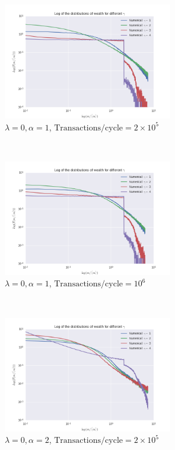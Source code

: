 \documentclass[a4paper, 10pt]{article}
\begin{document}
\begin{figure}[!hb] %
    \begin{subfigure}[H!]{0.5\textwidth}
        \centering
        \includegraphics[height=2.0in]{logDistGammasA1.png} %
        \caption{$\lambda=0, \alpha=1$, $\mathrm{Transactions/cycle}=2\times 10^5$}
    \end{subfigure}%
    ~ 
    \begin{subfigure}[H!]{0.5\textwidth}
        \centering
        \includegraphics[height=2.0in]{logDistGammasA1_v2.png}
        \caption{$\lambda=0, \alpha=1$, $\mathrm{Transactions/cycle}= 10^6$}
    \end{subfigure}
     ~
    \begin{subfigure}[H!]{0.5\textwidth}
        \centering
        \includegraphics[height=2.0in]{logDistGammasA2.png}
        \caption{$\lambda=0, \alpha=2$, $\mathrm{Transactions/cycle}=2\times 10^5$}
    \end{subfigure}
     ~
    \begin{subfigure}[H!]{0.5\textwidth}

\end{subfigure}
\end{figure}
\end{document}

